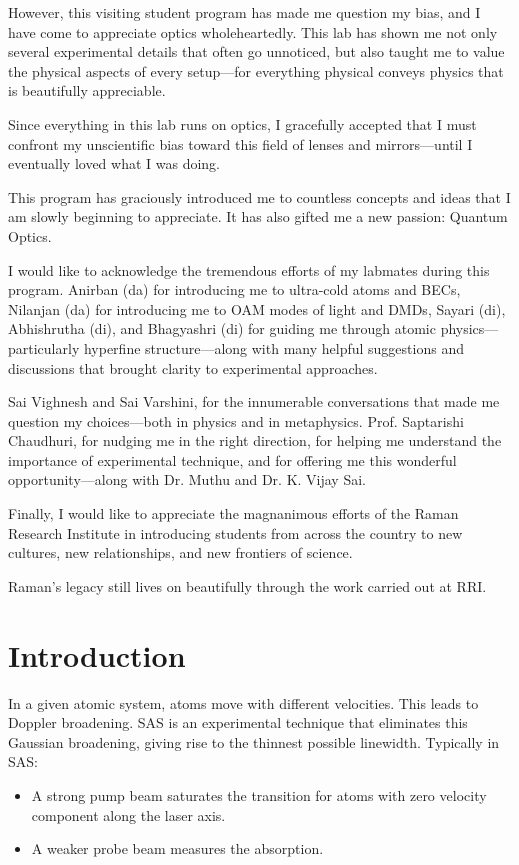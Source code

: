 \documentclass[a4paper, 12pt]{article}
\begin{document}
However, this visiting student program has made me question my bias, and I have come to appreciate optics wholeheartedly. This lab has shown me not only several experimental details that often go unnoticed, but also taught me to value the physical aspects of every setup—for everything physical conveys physics that is beautifully appreciable.

Since everything in this lab runs on optics, I gracefully accepted that I must confront my unscientific bias toward this field of lenses and mirrors—until I eventually loved what I was doing.

This program has graciously introduced me to countless concepts and ideas that I am slowly beginning to appreciate. It has also gifted me a new passion: Quantum Optics.

I would like to acknowledge the tremendous efforts of my labmates during this program. Anirban (da) for introducing me to ultra-cold atoms and BECs, Nilanjan (da) for introducing me to OAM modes of light and DMDs, Sayari (di), Abhishrutha (di), and Bhagyashri (di) for guiding me through atomic physics—particularly hyperfine structure—along with many helpful suggestions and discussions that brought clarity to experimental approaches.

Sai Vighnesh and Sai Varshini, for the innumerable conversations that made me question my choices—both in physics and in metaphysics. Prof. Saptarishi Chaudhuri, for nudging me in the right direction, for helping me understand the importance of experimental technique, and for offering me this wonderful opportunity—along with Dr. Muthu and Dr. K. Vijay Sai.

Finally, I would like to appreciate the magnanimous efforts of the Raman Research Institute in introducing students from across the country to new cultures, new relationships, and new frontiers of science.

Raman's legacy still lives on beautifully through the work carried out at RRI.


\newpage

\section{Introduction}
In a given atomic system, atoms move with different velocities. This leads to Doppler broadening. SAS is an experimental technique that eliminates this Gaussian broadening, giving rise to the thinnest possible linewidth. Typically in SAS:
\begin{itemize}
  \item A strong pump beam saturates the transition for atoms with zero velocity component along the laser axis.
  \item A weaker probe beam measures the absorption.
\end{itemize}
\end{document}

